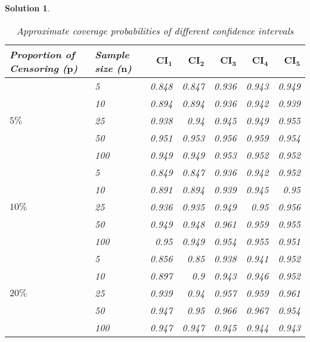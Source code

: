 \documentclass[12pt]{article}
\theoremstyle{problemstyle}
\newtheorem*{solution*}{Solution}
\begin{document}
\begin{solution*}
\begin{table}[ht]
    \centering
    \begin{tabular}{llrrrrr}
        \toprule
        Proportion of Censoring ($\mathbf{p}$) & Sample size ($\mathbf{n}$) & $\mathbf{CI_1}$ & $\mathbf{CI_2}$ & $\mathbf{CI_3}$ & $\mathbf{CI_4}$ & $\mathbf{CI_5}$\\
        \midrule
        \multirow{5}{*}{$5\%$} & 5 & 0.848 & 0.847 & 0.936 & 0.943 & 0.949 \\
        & 10 & 0.894 & 0.894 & 0.936 & 0.942 & 0.939 \\
        & 25 & 0.938 & 0.94 & 0.945 & 0.949 & 0.955 \\
        & 50 & 0.951 & 0.953 & 0.956 & 0.959 & 0.954 \\
        & 100 & 0.949 & 0.949 & 0.953 & 0.952 & 0.952 \\
        \midrule
        \multirow{5}{*}{$10\%$} & 5 & 0.849 & 0.847 & 0.936 & 0.942 & 0.952 \\
        & 10 & 0.891 & 0.894 & 0.939 & 0.945 & 0.95 \\
        & 25 & 0.936 & 0.935 & 0.949 & 0.95 & 0.956 \\
        & 50 & 0.949 & 0.948 & 0.961 & 0.959 & 0.955 \\
        & 100 & 0.95 & 0.949 & 0.954 & 0.955 & 0.951 \\
        \midrule
        \multirow{5}{*}{$20\%$} & 5 & 0.856 & 0.85 & 0.938 & 0.941 & 0.952 \\
        & 10 & 0.897 & 0.9 & 0.943 & 0.946 & 0.952 \\
        & 25 & 0.939 & 0.94 & 0.957 & 0.959 & 0.961 \\
        & 50 & 0.947 & 0.95 & 0.966 & 0.967 & 0.954 \\
        & 100 & 0.947 & 0.947 & 0.945 & 0.944 & 0.943 \\
        \bottomrule
    \end{tabular}
    \caption{Approximate coverage probabilities of different confidence intervals}
    \label{tbl:ci-1}
\end{table}


\end{solution*}
\end{document}
